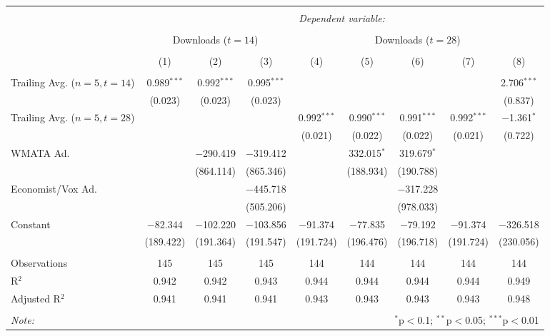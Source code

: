 \documentclass[11pt, letterpaper, twoside]{article}
\begin{document}
\begin{landscape}
    \thispagestyle{empty}
    \begin{table}[!htbp] \centering
        \caption{}
        \label{}
      \begin{tabular}{@{\extracolsep{5pt}}lcccccccc} 
      \\[-1.8ex]\hline
      \hline \\[-1.8ex]
       & \multicolumn{8}{c}{\textit{Dependent variable:}} \\
      \cline{2-9} 
      \\[-1.8ex] & \multicolumn{3}{c}{Downloads ($t=14$)} & \multicolumn{5}{c}{Downloads ($t=28$)} \\       
      \\[-1.8ex] & (1) & (2) & (3) & (4) & (5) & (6) & (7) & (8)\\ 
      \hline \\[-1.8ex]
       Trailing Avg. ($n=5, t=14$) & 0.989$^{***}$ & 0.992$^{***}$ & 0.995$^{***}$ &  &  &  &  & 2.706$^{***}$ \\
        & (0.023) & (0.023) & (0.023) &  &  &  &  & (0.837) \\
        Trailing Avg. ($n=5, t=28$) &  &  &  & 0.992$^{***}$ & 0.990$^{***}$ & 0.991$^{***}$ & 0.992$^{***}$ & $-$1.361$^{*}$ \\
        &  &  &  & (0.021) & (0.022) & (0.022) & (0.021) & (0.722) \\ 
        WMATA Ad. &  & $-$290.419 & $-$319.412 &  & 332.015$^{*}$ & 319.679$^{*}$ &  &  \\
        &  & (864.114) & (865.346) &  & (188.934) & (190.788) &  &  \\
        Economist/Vox Ad. &  &  & $-$445.718 &  &  & $-$317.228 &  &  \\ 
        &  &  & (505.206) &  &  & (978.033) &  &  \\
        Constant & $-$82.344 & $-$102.220 & $-$103.856 & $-$91.374 & $-$77.835 & $-$79.192 & $-$91.374 & $-$326.518 \\
        & (189.422) & (191.364) & (191.547) & (191.724) & (196.476) & (196.718) & (191.724) & (230.056) \\  
       \hline \\[-1.8ex]
      Observations & 145 & 145 & 145 & 144 & 144 & 144 & 144 & 144 \\ 
      R$^{2}$ & 0.942 & 0.942 & 0.943 & 0.944 & 0.944 & 0.944 & 0.944 & 0.949 \\
      Adjusted R$^{2}$ & 0.941 & 0.941 & 0.941 & 0.943 & 0.943 & 0.943 & 0.943 & 0.948 \\ 
      \hline
      \hline \\[-1.8ex]
      \textit{Note:}  & \multicolumn{8}{r}{$^{*}$p$<$0.1; $^{**}$p$<$0.05; $^{***}$p$<$0.01} \\
      \end{tabular}
      \end{table}
\end{landscape}    
\end{document}

